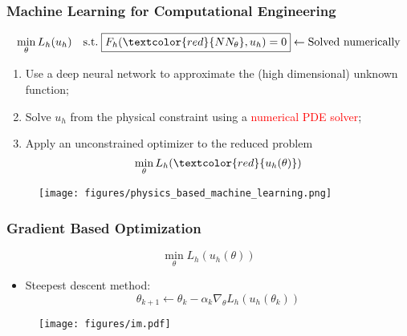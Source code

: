 \documentclass[usenames,dvipsnames]{beamer}
\begin{document}
\begin{frame}
	\frametitle{Machine Learning for Computational Engineering}
	$$\min_{\theta} L_h(u_h) \quad \mathrm{s.t.}\;\boxed{F_h(\textcolor{red}{NN_\theta}, u_h) = 0} \leftarrow \mbox{Solved numerically}$$
	\vspace{-0.5cm}
	\begin{enumerate}
		\item Use a deep neural network to approximate the (high dimensional) unknown function;
		\item Solve $u_h$ from the physical constraint using a \textcolor{red}{numerical PDE solver};
		\item Apply an unconstrained optimizer to the reduced problem
		$$\min_{\theta} L_h(\textcolor{red}{u_h(\theta)})$$
	\end{enumerate}
	\vspace{-0.3cm}
	\begin{figure}[hbt]
		\texttt{[image: figures/physics\_based\_machine\_learning.png]}
	\end{figure}
\end{frame}



\begin{frame}
	\frametitle{Gradient Based Optimization}
		$$\min_{\theta} L_h({u_h(\theta)})$$
	
	\begin{itemize}
		\item Steepest descent method:
		$$\theta_{k+1} \gets \theta_k - \alpha_k \nabla_\theta L_h(u_h(\theta_k))$$ 
	\end{itemize}
	
	\begin{figure}[hbt]
	\centering
  \texttt{[image: figures/im.pdf]}
\end{figure}

\end{frame}
\end{document}
